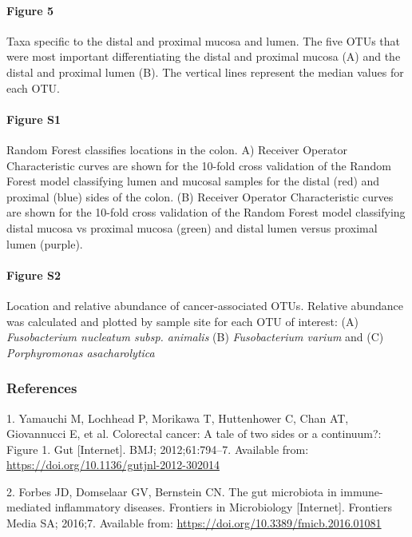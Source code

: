 \documentclass[12pt,]{article}
\let\oldparagraph\paragraph
\renewcommand{\paragraph}[1]{\oldparagraph{#1}\mbox{}}
\begin{document}
\newpage

\paragraph{Figure 5}\label{figure-5}

Taxa specific to the distal and proximal mucosa and lumen. The five OTUs
that were most important differentiating the distal and proximal mucosa
(A) and the distal and proximal lumen (B). The vertical lines represent
the median values for each OTU. \newpage

\paragraph{Figure S1}\label{figure-s1}

Random Forest classifies locations in the colon. A) Receiver Operator
Characteristic curves are shown for the 10-fold cross validation of the
Random Forest model classifying lumen and mucosal samples for the distal
(red) and proximal (blue) sides of the colon. (B) Receiver Operator
Characteristic curves are shown for the 10-fold cross validation of the
Random Forest model classifying distal mucosa vs proximal mucosa (green)
and distal lumen versus proximal lumen (purple).

\newpage

\paragraph{Figure S2}\label{figure-s2}

Location and relative abundance of cancer-associated OTUs. Relative
abundance was calculated and plotted by sample site for each OTU of
interest: (A) \emph{Fusobacterium nucleatum subsp. animalis} (B)
\emph{Fusobacterium varium} and (C) \emph{Porphyromonas asacharolytica}

\subsubsection*{References}\label{references}

\hypertarget{refs}{}
\hypertarget{ref-Yamauchi2012}{}
1. Yamauchi M, Lochhead P, Morikawa T, Huttenhower C, Chan AT,
Giovannucci E, et al. Colorectal cancer: A tale of two sides or a
continuum?: Figure 1. Gut {[}Internet{]}. BMJ; 2012;61:794--7. Available
from: \url{https://doi.org/10.1136/gutjnl-2012-302014}

\hypertarget{ref-Forbes2016}{}
2. Forbes JD, Domselaar GV, Bernstein CN. The gut microbiota in
immune-mediated inflammatory diseases. Frontiers in Microbiology
{[}Internet{]}. Frontiers Media SA; 2016;7. Available from:
\url{https://doi.org/10.3389/fmicb.2016.01081}
\end{document}
